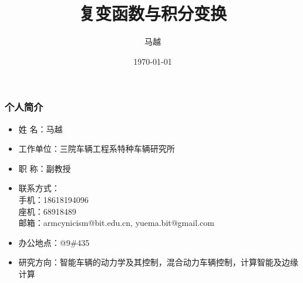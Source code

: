\documentclass{beamer}
\title[复变函数]{\Huge{复变函数与积分变换 }} %
\author{马越} %
\institute[北京理工大学机械与车辆学院 ] %
{
北京理工大学 \\ %
\medskip
\textbf{yuema.bit@gmail.com} %
}
\date{\today} %
\begin{document}




\begin{frame}[t]
\titlepage %
\end{frame}

\begin{frame}[t]
\frametitle{个人简介}
\begin{itemize}
    \item 姓    名：马越
    \item 工作单位：三院车辆工程系特种车辆研究所
\item 职    称：副教授
\item 联系方式：\\
手机：18618194096\\
座机：68918489     \\  
邮箱：armcynicism@bit.edu.cn, yuema.bit@gmail.com
\item 办公地点：@9\#435
\item 研究方向：智能车辆的动力学及其控制，混合动力车辆控制，计算智能及边缘计算
\end{itemize}

\end{frame}




\end{document}
